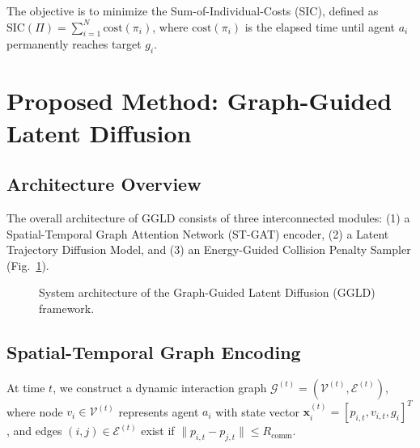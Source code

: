 \documentclass[runningheads]{llncs}
\begin{document}
The objective is to minimize the Sum-of-Individual-Costs (SIC), defined as $\text{SIC}(\Pi) = \sum_{i=1}^N \text{cost}(\pi_i)$, where $\text{cost}(\pi_i)$ is the elapsed time until agent $a_i$ permanently reaches target $g_i$.

\section{Proposed Method: Graph-Guided Latent Diffusion}

\subsection{Architecture Overview}
The overall architecture of GGLD consists of three interconnected modules: (1) a Spatial-Temporal Graph Attention Network (ST-GAT) encoder, (2) a Latent Trajectory Diffusion Model, and (3) an Energy-Guided Collision Penalty Sampler (Fig.~\ref{fig:architecture}).

\begin{figure}[t]
\centering
{}
\caption{System architecture of the Graph-Guided Latent Diffusion (GGLD) framework.}
\label{fig:architecture}
\end{figure}

\subsection{Spatial-Temporal Graph Encoding}
At time $t$, we construct a dynamic interaction graph $\mathcal{G}^{(t)} = (\mathcal{V}^{(t)}, \mathcal{E}^{(t)})$, where node $v_i \in \mathcal{V}^{(t)}$ represents agent $a_i$ with state vector $\mathbf{x}_i^{(t)} = [p_{i,t}, v_{i,t}, g_i]^T$, and edges $(i, j) \in \mathcal{E}^{(t)}$ exist if $\|p_{i,t} - p_{j,t}\| \le R_{\text{comm}}$.
\end{document}
